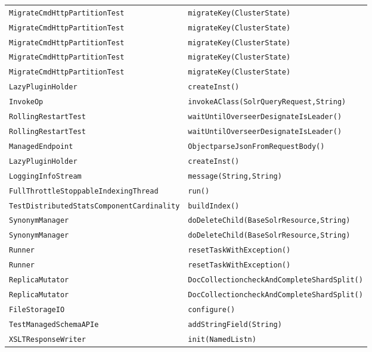 \begin{center}
\begin{longtable}{ll}
\lstinline/MigrateCmdHttpPartitionTest/&{\lstinline/migrateKey(ClusterState)/}\\
\lstinline/MigrateCmdHttpPartitionTest/&{\lstinline/migrateKey(ClusterState)/}\\
\lstinline/MigrateCmdHttpPartitionTest/&{\lstinline/migrateKey(ClusterState)/}\\
\lstinline/MigrateCmdHttpPartitionTest/&{\lstinline/migrateKey(ClusterState)/}\\
\lstinline/MigrateCmdHttpPartitionTest/&{\lstinline/migrateKey(ClusterState)/}\\
\lstinline/LazyPluginHolder/&{\lstinline/createInst()/}\\
\lstinline/InvokeOp/&{\lstinline/invokeAClass(SolrQueryRequest,String)/}\\
\lstinline/RollingRestartTest/&{\lstinline/waitUntilOverseerDesignateIsLeader()/}\\
\lstinline/RollingRestartTest/&{\lstinline/waitUntilOverseerDesignateIsLeader()/}\\
\lstinline/ManagedEndpoint/&{\lstinline/ObjectparseJsonFromRequestBody()/}\\
\lstinline/LazyPluginHolder/&{\lstinline/createInst()/}\\
\lstinline/LoggingInfoStream/&{\lstinline/message(String,String)/}\\
\lstinline/FullThrottleStoppableIndexingThread/&{\lstinline/run()/}\\
\lstinline/TestDistributedStatsComponentCardinality/&{\lstinline/buildIndex()/}\\
\lstinline/SynonymManager/&{\lstinline/doDeleteChild(BaseSolrResource,String)/}\\
\lstinline/SynonymManager/&{\lstinline/doDeleteChild(BaseSolrResource,String)/}\\
\lstinline/Runner/&{\lstinline/resetTaskWithException()/}\\
\lstinline/Runner/&{\lstinline/resetTaskWithException()/}\\
\lstinline/ReplicaMutator/&{\lstinline/DocCollectioncheckAndCompleteShardSplit()/}\\
\lstinline/ReplicaMutator/&{\lstinline/DocCollectioncheckAndCompleteShardSplit()/}\\
\lstinline/FileStorageIO/&{\lstinline/configure()/}\\
\lstinline/TestManagedSchemaAPIe/&{\lstinline/addStringField(String)/}\\
\lstinline/XSLTResponseWriter/&{\lstinline/init(NamedListn)/}\\

\end{longtable}
\end{center}
